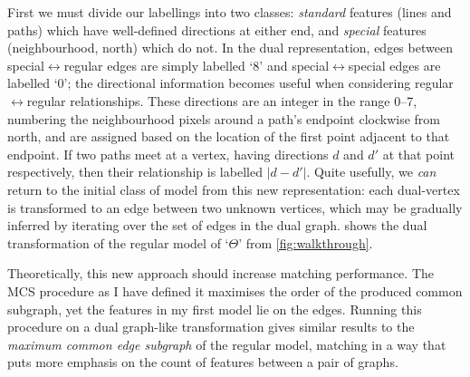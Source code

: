 \documentclass{mpaper}
\begin{document}
First we must divide our labellings into two classes: \emph{standard} features (lines and paths) which have well-defined directions at either end, and \emph{special} features (neighbourhood, north) which do not.
In the dual representation, edges between special$\leftrightarrow$regular edges are simply labelled `8' and special$\leftrightarrow$special edges are labelled `0'; the directional information becomes useful when considering regular$\leftrightarrow$regular relationships.
These directions are an integer in the range 0--7, numbering the neighbourhood pixels around a path's endpoint clockwise from north, and are assigned based on the location of the first point adjacent to that endpoint.
If two paths meet at a vertex, having directions $d$ and $d'$ at that point respectively, then their relationship is labelled $|d-d'|$.
Quite usefully, we \emph{can} return to the initial class of model from this new representation: each dual-vertex is transformed to an edge between two unknown vertices, which may be gradually inferred by iterating over the set of edges in the dual graph.
 shows the dual transformation of the regular model of `$\Theta$' from \cref{fig:walkthrough}.

Theoretically, this new approach should increase matching performance.
The MCS procedure as I have defined it maximises the order of the produced common subgraph, yet the features in my first model lie on the edges.
Running this procedure on a dual graph-like transformation gives similar results to the \emph{maximum common edge subgraph} of the regular model, matching in a way that puts more emphasis on the count of features between a pair of graphs.
\end{document}
